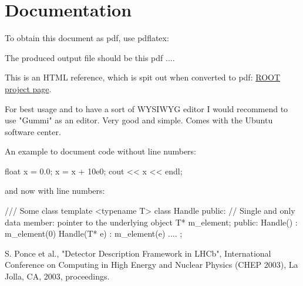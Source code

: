 \documentclass[10pt,a4paper]{article}
\begin{document}
\section{Documentation}
\label{sec:aida2020-section-documentation}
To obtain this document as pdf, use pdflatex:
The produced output file should be this pdf ....

\noindent
This is an HTML reference, which is spit out when converted to pdf: 
\href{http://root.cern.ch}{ROOT project page}.


For best usage and to have a sort of WYSIWYG editor I would recommend to use
"Gummi" as an editor. Very good and simple. Comes with the Ubuntu software center.


An example to document code without line numbers:
\begin{unnumberedcode}
   float x = 0.0;
   x = x + 10e0;
   cout << x << endl;
\end{unnumberedcode}


and now with line numbers:
\begin{code}    /// Some class
    template <typename T> class Handle  {
    public:
          // Single and only data member: pointer to the underlying object  
          T* m_element;
    public:
          Handle() : m_element(0)                  {                                     }
          Handle(T* e) : m_element(e)              {                                     }
          ....
    };
\end{code}

\newpage
\begin{thebibliography}{9}
 S. Ponce et al., 
                "Detector Description Framework in LHCb", 
                International Conference on Computing in High Energy and Nuclear Physics  (CHEP 2003), 
                La Jolla, CA, 2003, proceedings. 
\end{thebibliography}
\end{document}
